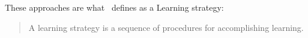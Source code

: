 \documentclass[\master/Master.tex]{subfiles}
\begin{document}
% 	
%
% 		
% 		
% 		
% 		
	
	
	These approaches are what~\cite{tobias1990a} defines as a Learning strategy:
	
\begin{quote}
	A learning strategy is a sequence of procedures for accomplishing learning.
\end{quote}
	
\end{document}
